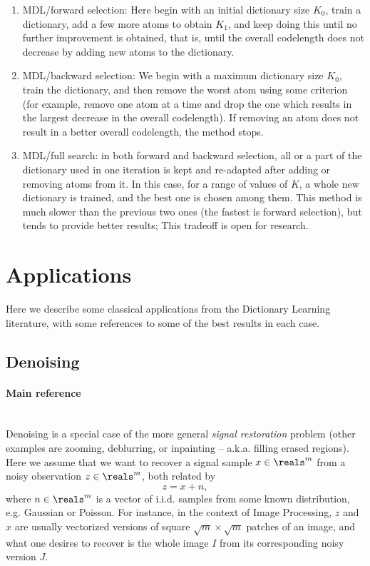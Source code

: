 \documentclass[a4paper]{IEEEtran}
\begin{document}
\begin{enumerate}
\item MDL/forward selection:  Here begin with an initial dictionary size $K_0$, train a dictionary, add a few more atoms to obtain $K_1$, and keep doing this until no further improvement is obtained, that is, until the overall codelength does not decrease by adding new atoms to the dictionary.
 
\item MDL/backward selection: We begin with a maximum dictionary size $K_0$, train the dictionary, and then remove the worst atom using some criterion (for example, remove one atom at a time and drop the one  which results in the largest decrease in the overall codelength). If removing an atom does not result in a better overall codelength, the method stops. 

\item MDL/full search: in both forward and backward selection, all or a part of the dictionary used in one iteration is kept and re-adapted after adding or removing atoms from it. In this case, for a range of values of $K$, a whole new dictionary is trained, and the best one is chosen among them. This method is much slower than the previous two ones (the fastest is forward selection), but tends to provide better results; This tradeoff is open for research.

\end{enumerate}


\section{Applications}

Here we describe some classical applications from the Dictionary Learning literature, with some references to some of the best results in each case.

\subsection{Denoising}

\paragraph{Main reference} \cite{ksvd}\\

Denoising is a special case of the more general \emph{signal restoration} problem (other examples are zooming, deblurring, or inpainting -- a.k.a. filling erased regions). Here we assume that we want to recover a signal sample $x \in \reals^{m}$ from a noisy observation $z \in \reals^{m}$, both related by
\[
z = x + n,
\]
where $n \in \reals^m$ is a vector of i.i.d. samples from some known distribution, e.g. Gaussian or Poisson. For instance, in the context of Image Processing, $z$ and $x$ are usually vectorized versions of square $\sqrt{m}\times\sqrt{m}$ patches of an image, and what one desires to recover is the whole image $I$ from its corresponding noisy version $J$.
\end{document}
